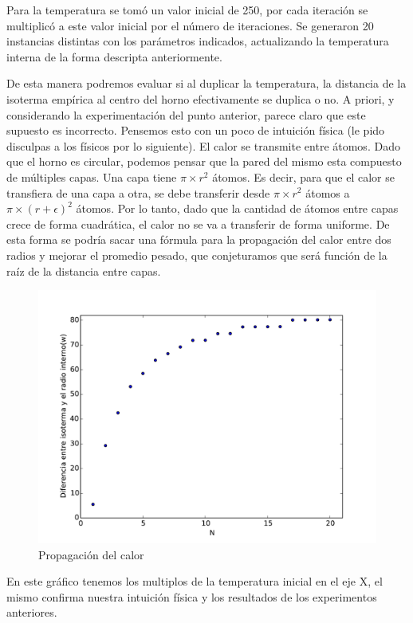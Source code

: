 Para la temperatura se tomó un valor inicial de 250, por cada iteración se multiplicó a este valor inicial por el número de iteraciones. Se generaron 20 instancias distintas con los parámetros indicados, actualizando la temperatura interna de la forma descripta anteriormente.

De esta manera podremos evaluar si al duplicar la temperatura, la distancia de la isoterma empírica al centro del horno efectivamente se duplica o no. A priori, y considerando la experimentación del punto anterior, parece claro que este supuesto es incorrecto. Pensemos esto con un poco de intuición física (le pido disculpas a los físicos por lo siguiente). El calor se transmite entre átomos. Dado que el horno es circular, podemos pensar que la pared del mismo esta compuesto de múltiples capas. Una capa tiene $\pi \times r^2$ átomos. Es decir, para que el calor se transfiera de una capa a otra, se debe transferir desde $\pi \times r^2$ átomos a $\pi \times (r+\epsilon)^2$ átomos. Por lo tanto, dado que la cantidad de átomos entre capas crece de forma cuadrática, el calor no se va a transferir de forma uniforme. De esta forma se podría sacar una fórmula para la propagación del calor entre dos radios y mejorar el promedio pesado, que conjeturamos que será función de la raíz de la distancia entre capas.

\begin{figure}[h]
\centering
\includegraphics[scale=0.6]{graficos/tempProp_w.pdf}
\caption{Propagación del calor}
\label{timeDim}
\end{figure}

En este gráfico tenemos los multiplos de la temperatura inicial en el eje X, el mismo confirma nuestra intuición física y los resultados de los experimentos anteriores.

